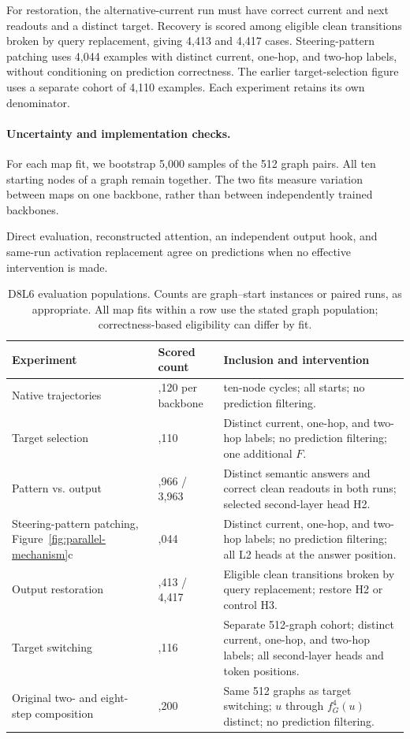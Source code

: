 \documentclass{article}
\begin{document}
For restoration, the alternative-current run must have correct current and next readouts and a distinct target. Recovery is scored among eligible clean transitions broken by query replacement, giving 4,413 and 4,417 cases. Steering-pattern patching uses 4,044 examples with distinct current, one-hop, and two-hop labels, without conditioning on prediction correctness. The earlier target-selection figure uses a separate cohort of 4,110 examples. Each experiment retains its own denominator.

\paragraph{Uncertainty and implementation checks.}
For each map fit, we bootstrap 5,000 samples of the 512 graph pairs. All ten starting nodes of a graph remain together. The two fits measure variation between maps on one backbone, rather than between independently trained backbones.

Direct evaluation, reconstructed attention, an independent output hook, and same-run activation replacement agree on predictions when no effective intervention is made.

\begin{table}[!htbp]
\centering
\caption{D8L6 evaluation populations. Counts are graph--start instances or paired runs, as appropriate. All map fits within a row use the stated graph population; correctness-based eligibility can differ by fit.}
\label{tab:graph-populations}
\begin{tabular}{@{}>{\raggedright\arraybackslash}p{.23\linewidth}>{\raggedright\arraybackslash}p{.20\linewidth}>{\raggedright\arraybackslash}p{.49\linewidth}@{}}\toprule
Experiment & Scored count & Inclusion and intervention\\\midrule
Native trajectories & 5,120 per backbone & 512 ten-node cycles; all starts; no prediction filtering.\\
Target selection & 4,110 & Distinct current, one-hop, and two-hop labels; no prediction filtering; one additional $F$.\\
Pattern vs. output & 3,966 / 3,963 & Distinct semantic answers and correct clean readouts in both runs; selected second-layer head H2.\\
Steering-pattern patching, Figure~\ref{fig:parallel-mechanism}c & 4,044 & Distinct current, one-hop, and two-hop labels; no prediction filtering; all L2 heads at the answer position.\\
Output restoration & 4,413 / 4,417 & Eligible clean transitions broken by query replacement; restore H2 or control H3.\\
Target switching & 4,116 & Separate 512-graph cohort; distinct current, one-hop, and two-hop labels; all second-layer heads and token positions.\\
Original two- and eight-step composition & 3,200 & Same 512 graphs as target switching; $u$ through $f_G^4(u)$ distinct; no prediction filtering.\\
\bottomrule\end{tabular}
\end{table}
\end{document}
